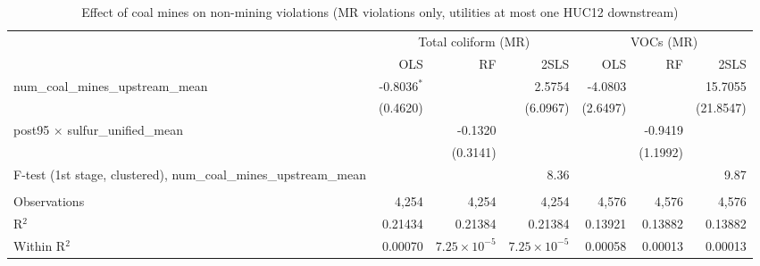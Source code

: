 
\begin{table}[htbp]
   
   \caption{\label{2sls_dwnstrm_nonminevio_mr} Effect of coal mines on non-mining violations (MR violations only, utilities at most one HUC12 downstream)}
   \bigskip
   
   \centering
   
   \begin{adjustbox}{width = \textwidth, center}
      
      
      \begin{tabular}{lrrrrrr}
         \toprule
         
          & \multicolumn{3}{c}{Total coliform (MR)} & \multicolumn{3}{c}{VOCs (MR)}\\
         
                                                                             & OLS           & RF                    & 2SLS                  & OLS      & RF       & 2SLS\\  
         
         \midrule 
         num\_coal\_mines\_upstream\_mean                                    & -0.8036$^{*}$ &                       & 2.5754                & -4.0803  &          & 15.7055\\   
                                                                             & (0.4620)      &                       & (6.0967)              & (2.6497) &          & (21.8547)\\   
         post95 $\times$ sulfur\_unified\_mean                               &               & -0.1320               &                       &          & -0.9419  &   \\   
                                                                             &               & (0.3141)              &                       &          & (1.1992) &   \\   
         
         F-test (1st stage, clustered), num\_coal\_mines\_upstream\_mean     &               &                       & 8.36                  &          &          & 9.87\\  
         
          \\
         
         Observations                                                        & 4,254         & 4,254                 & 4,254                 & 4,576    & 4,576    & 4,576\\  
         R$^2$                                                               & 0.21434       & 0.21384               & 0.21384               & 0.13921  & 0.13882  & 0.13882\\  
         Within R$^2$                                                        & 0.00070       & $7.25\times 10^{-5}$  & $7.25\times 10^{-5}$  & 0.00058  & 0.00013  & 0.00013\\  
         

\end{tabular}
\end{adjustbox}
\end{table}
